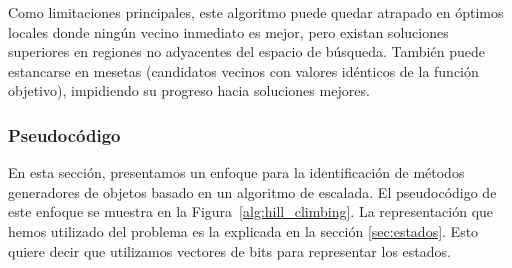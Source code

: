 Como limitaciones principales, este algoritmo puede quedar atrapado en óptimos locales donde ningún vecino inmediato es mejor, 
pero existan soluciones superiores en regiones no adyacentes del espacio de búsqueda. 
También puede estancarse en mesetas (candidatos vecinos con valores idénticos de la función objetivo), 
impidiendo su progreso hacia soluciones mejores.





\subsubsection{Pseudocódigo}

En esta sección, presentamos un enfoque para la identificación de métodos generadores de objetos basado en un algoritmo de escalada. El pseudocódigo de este enfoque se muestra en la Figura~\ref{alg:hill_climbing}.
La representación que hemos utilizado del problema es la explicada en la sección \ref{sec:estados}. Esto quiere decir que utilizamos vectores de bits para representar los estados. 



